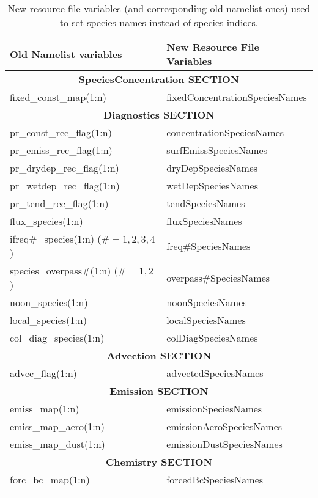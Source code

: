 \begin{center}
\begin{longtable}{|l|l|} \hline\hline
{\bf Old Namelist variables} & {\bf New Resource File Variables} \\ \hline\hline
\multicolumn{2}{|c|}{\bf SpeciesConcentration SECTION } \\ \hline\hline
fixed\_const\_map(1:n)                      & fixedConcentrationSpeciesNames \\ \hline\hline
\multicolumn{2}{|c|}{\bf Diagnostics SECTION } \\ \hline\hline
pr\_const\_rec\_flag(1:n)                   & concentrationSpeciesNames   \\
pr\_emiss\_rec\_flag(1:n)                   & surfEmissSpeciesNames       \\
pr\_drydep\_rec\_flag(1:n)                  & dryDepSpeciesNames          \\
pr\_wetdep\_rec\_flag(1:n)                  & wetDepSpeciesNames          \\
pr\_tend\_rec\_flag(1:n)                    & tendSpeciesNames            \\
flux\_species(1:n)                          & fluxSpeciesNames            \\
ifreq$\#$\_species(1:n) ($\# = 1, 2, 3, 4$) & freq$\#$SpeciesNames        \\
species\_overpass$\#$(1:n) ($\# = 1, 2$)    & overpass$\#$SpeciesNames    \\
noon\_species(1:n)                          & noonSpeciesNames            \\
local\_species(1:n)                         & localSpeciesNames           \\
col\_diag\_species(1:n)                     & colDiagSpeciesNames        \\ \hline\hline
\multicolumn{2}{|c|}{\bf Advection SECTION } \\ \hline\hline
advec\_flag(1:n)                            & advectedSpeciesNames  \\ \hline\hline
\multicolumn{2}{|c|}{\bf Emission SECTION } \\ \hline\hline
emiss\_map(1:n)                             & emissionSpeciesNames  \\
emiss\_map\_aero(1:n)                       & emissionAeroSpeciesNames  \\
emiss\_map\_dust(1:n)                       & emissionDustSpeciesNames  \\ \hline\hline
\multicolumn{2}{|c|}{\bf Chemistry SECTION } \\ \hline\hline
forc\_bc\_map(1:n)                          & forcedBcSpeciesNames \\ \hline\hline
\caption{New resource file variables (and corresponding old namelist ones) used to set species names 
instead of species indices.}
\label{tab:nlNewVars}
\end{longtable}
\end{center}

